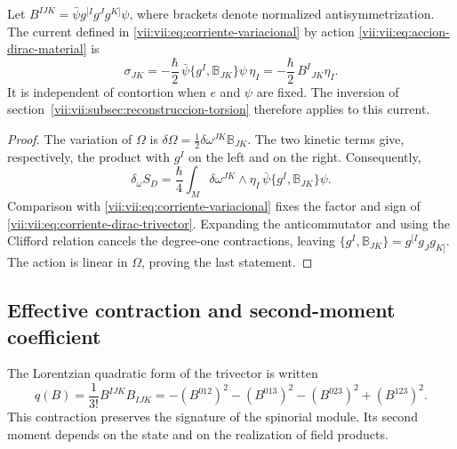 \begin{proposition}
\label{vii:vii:prop:corriente-dirac-explicita}
Let
\(B^{IJK}=\bar\psi g^{[I}g^Jg^{K]}\psi\), where brackets
denote normalized antisymmetrization. The current defined in
\eqref{vii:vii:eq:corriente-variacional} by action
\eqref{vii:vii:eq:accion-dirac-material} is
\begin{equation}
 \sigma_{JK}
 =-\frac{\hbar}{2}\,
   \bar\psi\{g^I,\mathbb B_{JK}\}\psi\,\eta_I
 =-\frac{\hbar}{2}\,B^I{}_{JK}\eta_I.
 \label{vii:vii:eq:corriente-dirac-trivector}
\end{equation}
It is independent of contortion when \(e\) and \(\psi\) are
fixed. The inversion of section~\ref{vii:vii:subsec:reconstruccion-torsion}
therefore applies to this current.
\end{proposition}
\begin{proof}
The variation of \(\Omega\) is
\(\delta\Omega=\frac12\delta\omega^{JK}\mathbb B_{JK}\).
The two kinetic terms give, respectively, the product with
\(g^I\) on the left and on the right. Consequently,
\[
 \delta_\omega S_D
 =\frac{\hbar}{4}\int_M\delta\omega^{JK}\wedge\eta_I\,
                 \bar\psi\{g^I,\mathbb B_{JK}\}\psi.
\]
Comparison with \eqref{vii:vii:eq:corriente-variacional} fixes the
factor and sign of \eqref{vii:vii:eq:corriente-dirac-trivector}.
Expanding the anticommutator and using the Clifford relation
cancels the degree-one contractions, leaving
\(\{g^I,\mathbb B_{JK}\}=g^{[I}g_Jg_{K]}\).
The action is linear in \(\Omega\), proving the last
statement.
\end{proof}

\subsection{Effective contraction and second-moment coefficient}
\label{vii:vii:subsec:contraccion-espinorial}

The Lorentzian quadratic form of the trivector is written
\begin{equation}
 q(B)=\frac1{3!}B^{IJK}B_{IJK}
 =-(B^{012})^2-(B^{013})^2-(B^{023})^2+(B^{123})^2.
 \label{vii:vii:eq:cuadratica-trivector}
\end{equation}
This contraction preserves the signature of the spinorial module. Its second
moment depends on the state and on the realization of field
products.

